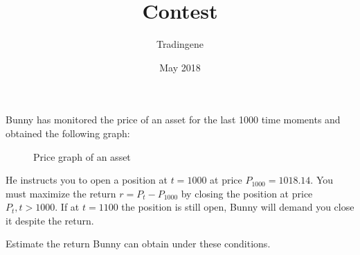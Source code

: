 \documentclass{article}
\title{Contest}
\author{Tradingene }
\date{May 2018}
\begin{document}
\maketitle

Bunny has monitored the price of an asset for the last 1000 time moments and obtained the following graph:

\begin{figure}[htbp]
\hspace*{0.1cm}                                     
   
  \caption{Price graph of an asset}
  \label{fig:Prob1:MEA}
\end{figure}

He instructs you to open a position at $t = 1000$ at price $P_{1000} = 1018.14$. You must maximize the return $r = P_t - P_{1000}$ by closing the position at price $P_t, t > 1000$. If at $t = 1100$ the position is still open, Bunny will demand you close it despite the return.

Estimate the return Bunny can obtain under these conditions.
\end{document}
